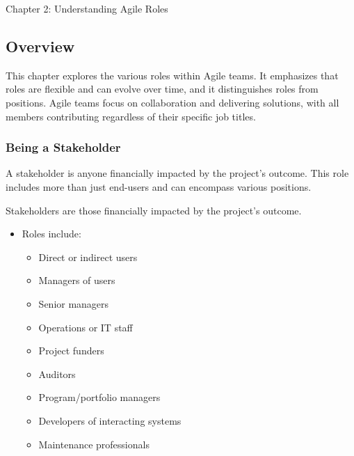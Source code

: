 \begin{notes}{Chapter 2: Understanding Agile Roles}
    \subsection*{Overview}

    This chapter explores the various roles within Agile teams. It emphasizes that roles are flexible and can evolve over time, and it distinguishes roles from positions. Agile teams focus on collaboration 
    and delivering solutions, with all members contributing regardless of their specific job titles.
    
    \subsubsection*{Being a Stakeholder}
    
    A stakeholder is anyone financially impacted by the project's outcome. This role includes more than just end-users and can encompass various positions.
    
    \begin{highlight}
    
        Stakeholders are those financially impacted by the project's outcome.
        
        \begin{itemize}
            \item Roles include:
            \begin{itemize}
                \item Direct or indirect users
                \item Managers of users
                \item Senior managers
                \item Operations or IT staff
                \item Project funders
                \item Auditors
                \item Program/portfolio managers
                \item Developers of interacting systems
                \item Maintenance professionals
            \end{itemize}
        \end{itemize}
    
    \end{highlight}
    

\end{notes}
